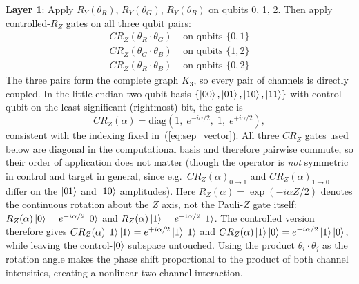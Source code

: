 \documentclass[conference,compsoc]{IEEEtran}
\begin{document}
\textbf{Layer 1}: Apply $R_Y(\theta_R)$, $R_Y(\theta_G)$, $R_Y(\theta_B)$ on qubits 0, 1, 2.
Then apply controlled-$R_Z$ gates on all three qubit pairs:
\begin{align}
    CR_Z(\theta_R \cdot \theta_G) &\text{ on qubits } \{0,1\} \nonumber \\
    CR_Z(\theta_G \cdot \theta_B) &\text{ on qubits } \{1,2\} \nonumber \\
    CR_Z(\theta_R \cdot \theta_B) &\text{ on qubits } \{0,2\}
    \label{eq:cp2l_layer}
\end{align}
The three pairs form the complete graph $K_3$, so every pair of channels is directly coupled.
In the little-endian two-qubit basis $\{\ket{00},\ket{01},\ket{10},\ket{11}\}$ with control qubit on the least-significant (rightmost) bit, the gate is
\begin{equation}
    CR_Z(\alpha) = \text{diag}\!\left(1,\; e^{-i\alpha/2},\; 1,\; e^{+i\alpha/2}\right),
\end{equation}
consistent with the indexing fixed in~(\ref{eq:sep_vector}).
All three $CR_Z$ gates used below are diagonal in the computational basis and therefore pairwise commute, so their order of application does not matter (though the operator is \emph{not} symmetric in control and target in general, since e.g.\ $CR_Z(\alpha)_{0\to 1}$ and $CR_Z(\alpha)_{1\to 0}$ differ on the $\ket{01}$ and $\ket{10}$ amplitudes).
Here $R_Z(\alpha) = \exp(-i\alpha Z/2)$ denotes the continuous rotation about the $Z$ axis, not the Pauli-$Z$ gate itself: $R_Z(\alpha)\ket{0} = e^{-i\alpha/2}\ket{0}$ and $R_Z(\alpha)\ket{1} = e^{+i\alpha/2}\ket{1}$.
The controlled version therefore gives $CR_Z(\alpha)\ket{1}\ket{1} = e^{+i\alpha/2}\ket{1}\ket{1}$ and $CR_Z(\alpha)\ket{1}\ket{0} = e^{-i\alpha/2}\ket{1}\ket{0}$, while leaving the control-$\ket{0}$ subspace untouched.
Using the product $\theta_i \cdot \theta_j$ as the rotation angle makes the phase shift proportional to the product of both channel intensities, creating a nonlinear two-channel interaction.
\end{document}
